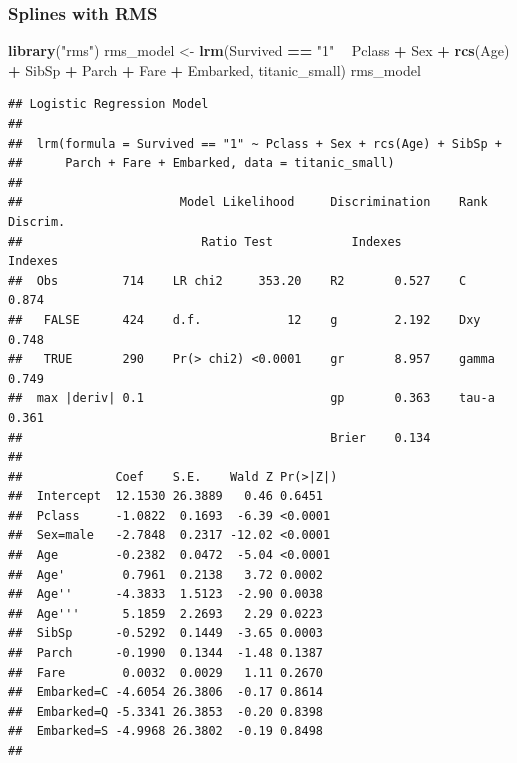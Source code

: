 \documentclass[]{krantz}
\newenvironment{Shaded}{\begin{snugshade}}{\end{snugshade}}
\newcommand{\KeywordTok}[1]{\textcolor[rgb]{0.13,0.29,0.53}{\textbf{#1}}}
\newcommand{\NormalTok}[1]{#1}
\newcommand{\OperatorTok}[1]{\textcolor[rgb]{0.81,0.36,0.00}{\textbf{#1}}}
\newcommand{\StringTok}[1]{\textcolor[rgb]{0.31,0.60,0.02}{#1}}
\theoremstyle{definition}
\theoremstyle{definition}
\theoremstyle{definition}
\theoremstyle{remark}
\begin{document}
\hypertarget{splines-with-rms}{%
\subsubsection{Splines with RMS}\label{splines-with-rms}}

\begin{Shaded}
\begin{Highlighting}[]
\KeywordTok{library}\NormalTok{(}\StringTok{"rms"}\NormalTok{)}
\NormalTok{rms_model <-}\StringTok{ }\KeywordTok{lrm}\NormalTok{(Survived }\OperatorTok{==}\StringTok{ "1"} \OperatorTok{~}\StringTok{ }\NormalTok{Pclass }\OperatorTok{+}\StringTok{ }\NormalTok{Sex }\OperatorTok{+}\StringTok{ }\KeywordTok{rcs}\NormalTok{(Age) }\OperatorTok{+}\StringTok{ }\NormalTok{SibSp }\OperatorTok{+}
\StringTok{                   }\NormalTok{Parch }\OperatorTok{+}\StringTok{ }\NormalTok{Fare }\OperatorTok{+}\StringTok{ }\NormalTok{Embarked, titanic_small)}
\NormalTok{rms_model}
\end{Highlighting}
\end{Shaded}

\begin{verbatim}
## Logistic Regression Model
##  
##  lrm(formula = Survived == "1" ~ Pclass + Sex + rcs(Age) + SibSp + 
##      Parch + Fare + Embarked, data = titanic_small)
##  
##                      Model Likelihood     Discrimination    Rank Discrim.    
##                         Ratio Test           Indexes           Indexes       
##  Obs         714    LR chi2     353.20    R2       0.527    C       0.874    
##   FALSE      424    d.f.            12    g        2.192    Dxy     0.748    
##   TRUE       290    Pr(> chi2) <0.0001    gr       8.957    gamma   0.749    
##  max |deriv| 0.1                          gp       0.363    tau-a   0.361    
##                                           Brier    0.134                     
##  
##             Coef    S.E.    Wald Z Pr(>|Z|)
##  Intercept  12.1530 26.3889   0.46 0.6451  
##  Pclass     -1.0822  0.1693  -6.39 <0.0001 
##  Sex=male   -2.7848  0.2317 -12.02 <0.0001 
##  Age        -0.2382  0.0472  -5.04 <0.0001 
##  Age'        0.7961  0.2138   3.72 0.0002  
##  Age''      -4.3833  1.5123  -2.90 0.0038  
##  Age'''      5.1859  2.2693   2.29 0.0223  
##  SibSp      -0.5292  0.1449  -3.65 0.0003  
##  Parch      -0.1990  0.1344  -1.48 0.1387  
##  Fare        0.0032  0.0029   1.11 0.2670  
##  Embarked=C -4.6054 26.3806  -0.17 0.8614  
##  Embarked=Q -5.3341 26.3853  -0.20 0.8398  
##  Embarked=S -4.9968 26.3802  -0.19 0.8498  
## 
\end{verbatim}
\end{document}
